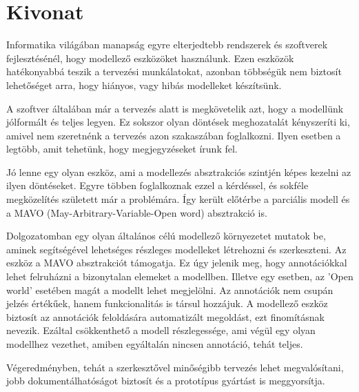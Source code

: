 \setcounter{page}{1}

\selecthungarian

\chapter*{Kivonat}


Informatika világában manapság egyre elterjedtebb rendszerek és szoftverek fejlesztésénél, hogy modellező eszközöket használunk. Ezen eszközök hatékonyabbá teszik a tervezési munkálatokat, azonban többségük nem biztosít lehetőséget arra, hogy hiányos, vagy hibás modelleket készítsünk. 
\par
A szoftver általában már a tervezés alatt is megkövetelik azt, hogy a modellünk jólformált és teljes legyen. Ez sokszor olyan döntések meghozatalát kényszeríti ki, amivel nem szeretnénk a tervezés azon szakaszában foglalkozni. Ilyen esetben a legtöbb, amit tehetünk, hogy megjegyzéseket írunk fel. 
\par
Jó lenne egy olyan eszköz, ami a modellezés absztrakciós szintjén képes kezelni az ilyen döntéseket. 
Egyre többen foglalkoznak ezzel a kérdéssel, és sokféle megközelítés született már a problémára. Így került előtérbe a parciális modell és a MAVO (May-Arbitrary-Variable-Open word) absztrakció is. 
\par
Dolgozatomban egy olyan általános célú modellező környezetet mutatok be, aminek segítségével lehetséges részleges modelleket létrehozni és szerkeszteni. Az eszköz a MAVO absztrakciót támogatja. Ez úgy jelenik meg, hogy annotációkkal lehet felruházni a bizonytalan elemeket a modellben. Illetve egy esetben, az 'Open world' esetében magát a modellt lehet megjelölni. Az annotációk nem csupán jelzés értékűek, hanem funkcionalitás is társul hozzájuk. A modellező eszköz biztosít az annotációk feloldására automatizált megoldást, ezt finomításnak nevezik. Ezáltal csökkenthető a modell részlegessége, ami végül egy olyan modellhez vezethet, amiben egyáltalán nincsen annotáció, tehát teljes.
\par
Végeredményben, tehát a szerkesztővel minőségibb tervezés lehet megvalósítani, jobb dokumentálhatóságot biztosít és a prototípus gyártást is meggyorsítja.



